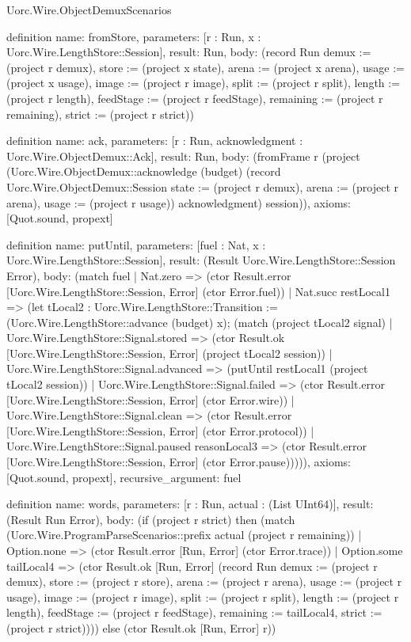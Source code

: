 \begin{lexlean}{Uorc.Wire.ObjectDemuxScenarios}
\begin{semanticmodule}
definition{
  name: fromStore,
  parameters: [r : Run, x : Uorc.Wire.LengthStore::Session],
  result: Run,
  body: (record Run {demux := (project r demux), store := (project x state), arena := (project x arena), usage := (project x usage), image := (project r image), split := (project r split), length := (project r length), feedStage := (project r feedStage), remaining := (project r remaining), strict := (project r strict)})
}

definition{
  name: ack,
  parameters: [r : Run, acknowledgment : Uorc.Wire.ObjectDemux::Ack],
  result: Run,
  body: (fromFrame r (project (Uorc.Wire.ObjectDemux::acknowledge (budget) (record Uorc.Wire.ObjectDemux::Session {state := (project r demux), arena := (project r arena), usage := (project r usage)}) acknowledgment) session)),
  axioms: [Quot.sound, propext]
}

definition{
  name: putUntil,
  parameters: [fuel : Nat, x : Uorc.Wire.LengthStore::Session],
  result: (Result Uorc.Wire.LengthStore::Session Error),
  body: (match fuel
    | Nat.zero => (ctor Result.error [Uorc.Wire.LengthStore::Session, Error] (ctor Error.fuel))
    | Nat.succ restLocal1 => (let tLocal2 : Uorc.Wire.LengthStore::Transition := (Uorc.Wire.LengthStore::advance (budget) x); (match (project tLocal2 signal)
      | Uorc.Wire.LengthStore::Signal.stored => (ctor Result.ok [Uorc.Wire.LengthStore::Session, Error] (project tLocal2 session))
      | Uorc.Wire.LengthStore::Signal.advanced => (putUntil restLocal1 (project tLocal2 session))
      | Uorc.Wire.LengthStore::Signal.failed => (ctor Result.error [Uorc.Wire.LengthStore::Session, Error] (ctor Error.wire))
      | Uorc.Wire.LengthStore::Signal.clean => (ctor Result.error [Uorc.Wire.LengthStore::Session, Error] (ctor Error.protocol))
      | Uorc.Wire.LengthStore::Signal.paused reasonLocal3 => (ctor Result.error [Uorc.Wire.LengthStore::Session, Error] (ctor Error.pause))))),
  axioms: [Quot.sound, propext],
  recursive_argument: fuel
}

definition{
  name: words,
  parameters: [r : Run, actual : (List UInt64)],
  result: (Result Run Error),
  body: (if (project r strict) then (match (Uorc.Wire.ProgramParseScenarios::prefix actual (project r remaining))
    | Option.none => (ctor Result.error [Run, Error] (ctor Error.trace))
    | Option.some tailLocal4 => (ctor Result.ok [Run, Error] (record Run {demux := (project r demux), store := (project r store), arena := (project r arena), usage := (project r usage), image := (project r image), split := (project r split), length := (project r length), feedStage := (project r feedStage), remaining := tailLocal4, strict := (project r strict)}))) else (ctor Result.ok [Run, Error] r))
}


\end{semanticmodule}
\end{lexlean}
